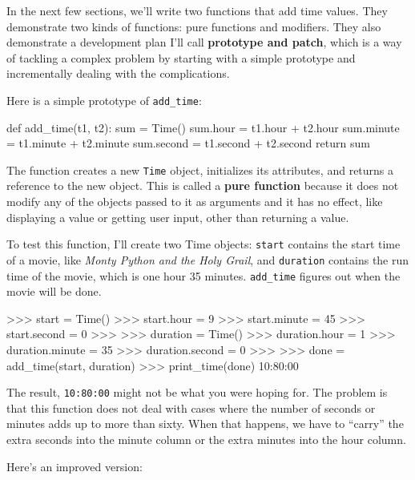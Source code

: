 
In the next few sections, we'll write two functions that add time
values.  They demonstrate two kinds of functions: pure functions and
modifiers.  They also demonstrate a development plan I'll call {\bf
  prototype and patch}, which is a way of tackling a complex problem
by starting with a simple prototype and incrementally dealing with the
complications.

Here is a simple prototype of \verb"add_time":

\beforeverb
\begin{pycode}
def add_time(t1, t2):
    sum = Time()
    sum.hour = t1.hour + t2.hour
    sum.minute = t1.minute + t2.minute
    sum.second = t1.second + t2.second
    return sum
\end{pycode}
\afterverb
%
The function creates a new {\tt Time} object, initializes its
attributes, and returns a reference to the new object.  This is called
a {\bf pure function} because it does not modify any of the objects
passed to it as arguments and it has no effect,
like displaying a value or getting user input, 
other than returning a value.


To test this function, I'll create two Time objects: {\tt start}
contains the start time of a movie, like {\em Monty Python and the
Holy Grail}, and {\tt duration} contains the run time of the movie,
which is one hour 35 minutes.
%
%
\verb"add_time" figures out when the movie will be done.

\beforeverb
\begin{pyinterpreter}
>>> start = Time()
>>> start.hour = 9
>>> start.minute = 45
>>> start.second =  0
>>>
>>> duration = Time()
>>> duration.hour = 1
>>> duration.minute = 35
>>> duration.second = 0
>>>
>>> done = add_time(start, duration)
>>> print_time(done)
10:80:00
\end{pyinterpreter}
\afterverb
%
The result, {\tt 10:80:00} might not be what you were hoping
for.  The problem is that this function does not deal with cases where the
number of seconds or minutes adds up to more than sixty.  When that
happens, we have to ``carry'' the extra seconds into the minute column
or the extra minutes into the hour column.


Here's an improved version:

